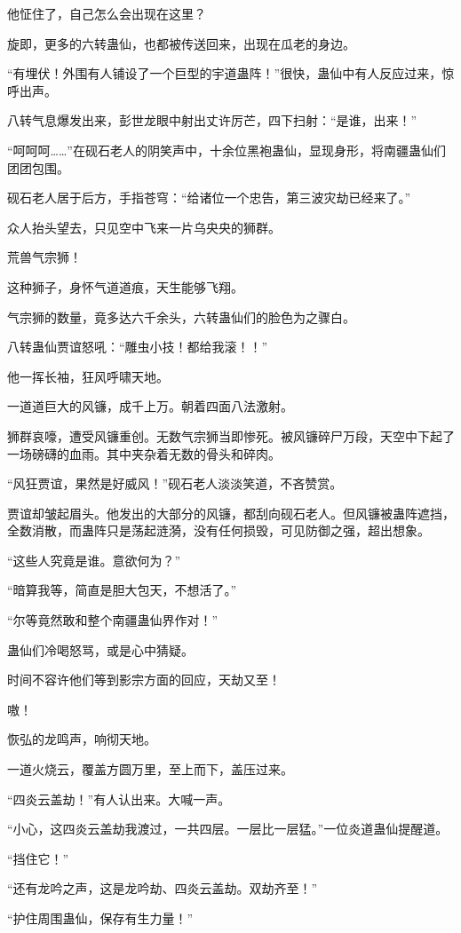 \begin{this_body}
他怔住了，自己怎么会出现在这里？

旋即，更多的六转蛊仙，也都被传送回来，出现在瓜老的身边。

“有埋伏！外围有人铺设了一个巨型的宇道蛊阵！”很快，蛊仙中有人反应过来，惊呼出声。

八转气息爆发出来，彭世龙眼中射出丈许厉芒，四下扫射：“是谁，出来！”

“呵呵呵……”在砚石老人的阴笑声中，十余位黑袍蛊仙，显现身形，将南疆蛊仙们团团包围。

砚石老人居于后方，手指苍穹：“给诸位一个忠告，第三波灾劫已经来了。”

众人抬头望去，只见空中飞来一片乌央央的狮群。

荒兽气宗狮！

这种狮子，身怀气道道痕，天生能够飞翔。

气宗狮的数量，竟多达六千余头，六转蛊仙们的脸色为之骤白。

八转蛊仙贾谊怒吼：“雕虫小技！都给我滚！！”

他一挥长袖，狂风呼啸天地。

一道道巨大的风镰，成千上万。朝着四面八法激射。

狮群哀嚎，遭受风镰重创。无数气宗狮当即惨死。被风镰碎尸万段，天空中下起了一场磅礴的血雨。其中夹杂着无数的骨头和碎肉。

“风狂贾谊，果然是好威风！”砚石老人淡淡笑道，不吝赞赏。

贾谊却皱起眉头。他发出的大部分的风镰，都刮向砚石老人。但风镰被蛊阵遮挡，全数消散，而蛊阵只是荡起涟漪，没有任何损毁，可见防御之强，超出想象。

“这些人究竟是谁。意欲何为？”

“暗算我等，简直是胆大包天，不想活了。”

“尔等竟然敢和整个南疆蛊仙界作对！”

蛊仙们冷喝怒骂，或是心中猜疑。

时间不容许他们等到影宗方面的回应，天劫又至！

嗷！

恢弘的龙鸣声，响彻天地。

一道火烧云，覆盖方圆万里，至上而下，盖压过来。

“四炎云盖劫！”有人认出来。大喊一声。

“小心，这四炎云盖劫我渡过，一共四层。一层比一层猛。”一位炎道蛊仙提醒道。

“挡住它！”

“还有龙吟之声，这是龙吟劫、四炎云盖劫。双劫齐至！”

“护住周围蛊仙，保存有生力量！”


\end{this_body}
